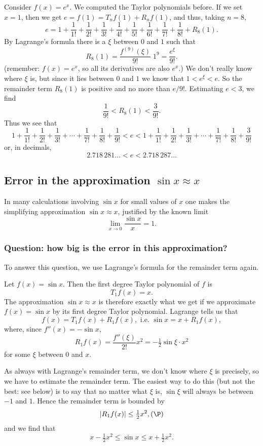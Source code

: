 Consider $f(x)=e^x$. We computed the Taylor polynomials before. If we  set
$x=1$, then we  get \( e=f(1)=T_nf(1) + R_nf(1)\), and thus, taking $n=8$,
\[
e=1+\frac1{1!}+\frac1{2!}+\frac1{3!}+\frac1{4!}
+\frac1{5!}+\frac1{6!}+\frac1{7!}+\frac1{8!}+R_8(1).
\]
By Lagrange's formula there is a $\xi$ between $0$ and $1$ such that
\[
R_8 (1) = \frac{f^{(9)} (\xi)}{9!} \; 1^9 = \frac{e^\xi}{9!}.
\]
(remember: $f(x) = e^x$, so all its derivatives are also $e^x$.)  We don't
really know where $\xi$ is, but since it lies between $0$ and $1$ we know
that $1<e^\xi<e$. So the remainder term $R_8 (1)$ is positive and no more
than $e/9!$. Estimating $e<3$, we find
\[
\frac1{9!}<R_8 (1) <\frac3{9!} .
\]
Thus we see that
\[
1+\frac1{1!}+\frac1{2!}+\frac1{3!}+\cdots+\frac1{7!}+\frac1{8!}+\frac1{9!}
<e<1+\frac1{1!}+\frac1{2!}+\frac1{3!}+\cdots+\frac1{7!}+\frac1{8!}+\frac3{9!}
\]
or, in decimals,
\[
2.718\,281\ldots < e < 2.718\,287\ldots
\]

\subsection{Error in the approximation $\sin x\approx x$} %
In many calculations involving $\sin x$ for small values of $x$ one makes
the simplifying approximation $\sin x\approx x$, justified by the known
limit
\[
\lim_{x\to 0} \frac{\sin x}x =1.
\]
\subsubsection{Question:  how big is the error in this approximation?}

To answer this question, we use Lagrange's formula for the remainder term
again.

Let $f (x)=\sin x$. Then the first degree Taylor polynomial of $f$ is
\[ T_1f(x) = x. \] The approximation $\sin x\approx x$ is therefore exactly
what we  get if we  approximate $f (x)=\sin x$ by its first degree Taylor
polynomial. Lagrange tells us that
\[
f(x) = T_1f(x)+R_1f(x), \text{ i.e. } \sin x = x +R_1f(x),
\]
where, since $f'' (x) = -\sin x$,
\[
R_1f(x) = \frac{f'' (\xi)}{2!}x^2 = -\tfrac12\sin\xi \cdot x^2
\]
for some $\xi$ between $0$ and $x$.

As always with Lagrange's remainder term, we don't know where $\xi$ is
precisely, so we have to estimate the remainder term. The easiest way to do
this (but not the best: see below) is to say that no matter what $\xi$ is,
$\sin \xi$ will always be between $-1$ and $1$. Hence the remainder term is
bounded by
\[
\left| R_1f(x)\right| \leq \tfrac12x^2, \leqno{(\P)}
\]
and we find that
\[
x-\tfrac12x^2 \leq \sin x \leq x+\tfrac12x^2.
\]
